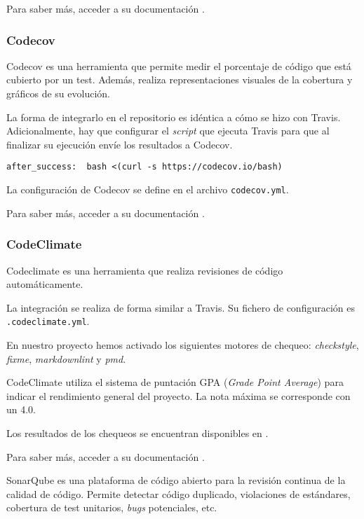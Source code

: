 
Para saber más, acceder a su documentación \citep{travis:doc}.

\subsubsection{Codecov}\label{codecov}

Codecov es una herramienta que permite medir el porcentaje de código que
está cubierto por un test. Además, realiza representaciones visuales de
la cobertura y gráficos de su evolución.

La forma de integrarlo en el repositorio es idéntica a cómo se hizo con
Travis. Adicionalmente, hay que configurar el \emph{script} que ejecuta
Travis para que al finalizar su ejecución envíe los resultados a
Codecov.

\texttt{after\_success:\ \ bash\ \textless{}(curl\ -s\ https://codecov.io/bash)}

La configuración de Codecov se define en el archivo
\texttt{codecov.yml}.


Para saber más, acceder a su documentación \citep{codecov:doc}.

\subsubsection{CodeClimate}\label{codeclimate}

Codeclimate es una herramienta que realiza revisiones de código
automáticamente.

La integración se realiza de forma similar a Travis. Su fichero de
configuración es \texttt{.codeclimate.yml}.

En nuestro proyecto hemos activado los siguientes motores de chequeo:
\emph{checkstyle}, \emph{fixme}, \emph{markdownlint} y \emph{pmd}.

CodeClimate utiliza el sistema de puntación GPA (\emph{Grade Point
Average}) para indicar el rendimiento general del proyecto. La nota
máxima se corresponde con un 4.0.

Los resultados de los chequeos se encuentran disponibles en
\citep{codeclimate:gobees}.


Para saber más, acceder a su documentación \citep{codeclimate:doc}.

SonarQube es una plataforma de código abierto para la revisión continua
de la calidad de código. Permite detectar código duplicado, violaciones
de estándares, cobertura de test unitarios, \emph{bugs} potenciales,
etc.

